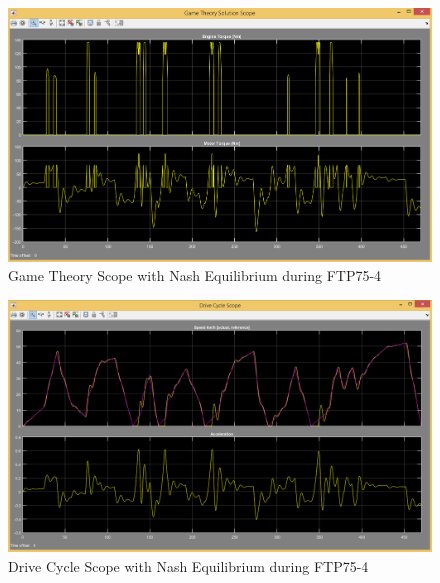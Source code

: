 
\begin{figure}[h]
\centering
\includegraphics[scale=0.4]{figures/NashEquilibrium/FTP75-4/gameTheory15Juni}
\caption{Game Theory Scope with Nash Equilibrium during FTP75-4}
\label{fig:gtne4}
\end{figure}

\begin{figure}[h]
\centering
\includegraphics[scale=0.4]{figures/NashEquilibrium/FTP75-4/driveCycle15Juni}
\caption{Drive Cycle Scope with Nash Equilibrium during FTP75-4}
\label{fig:dcne4}
\end{figure}


